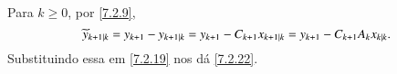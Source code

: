 \begin{Dem}
Para $k\ge0$, por \eqref{7.2.9},
\[
\widetilde y_{k+1|k} = y_{k+1} - y_{k+1|k} = y_{k+1} - C_{k+1}x_{k+1|k} = y_{k+1} - C_{k+1}A_kx_{k|k}.
\]
Substituindo essa em \eqref{7.2.19} nos dá \eqref{7.2.22}.
\end{Dem}



















































